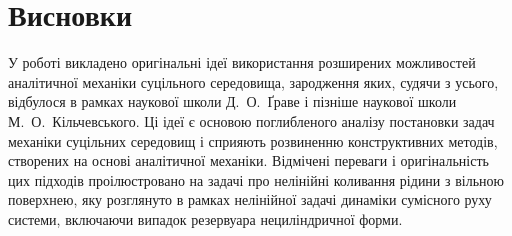 \documentclass[11pt, reqno]{amsart}
\begin{document}
\section{Висновки}
У роботі викладено оригінальні ідеї використання розширених можливостей аналітичної механіки суцільного середовища, зародження яких, судячи з усього, відбулося в рамках наукової школи Д.~О.~Ґраве і пізніше наукової школи М.~О.~Кільчевського. Ці ідеї є основою поглибленого аналізу постановки задач механіки суцільних середовищ і сприяють розвиненню конструктивних методів, створених на основі аналітичної механіки. Відмічені переваги і оригінальність цих підходів проілюстровано на задачі про нелінійні коливання рідини з вільною поверхнею, яку розглянуто в рамках нелінійної задачі динаміки сумісного руху системи, включаючи випадок резервуара нециліндричної форми.









\printArticleAuthorsInfo{\thearticlesnum}
\label{last_page:\thearticlesnum}
\end{document}
